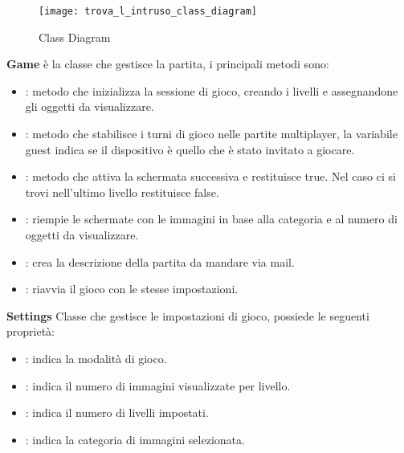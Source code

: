 \begin{figure}
	\centering
	\texttt{[image: trova\_l\_intruso\_class\_diagram]}
	\caption{Class Diagram}
	\label{fig:class_diagram}
\end{figure}
\begin{description}
\item \textbf{Game} \`{e} la classe che gestisce la partita, i principali metodi sono:
\begin{itemize}
\item {}: metodo che inizializza la sessione di gioco, creando i livelli e assegnandone gli oggetti da visualizzare.
\item {}: metodo che stabilisce i turni di gioco nelle partite multiplayer, la variabile guest indica se il dispositivo \`{e} quello che \`{e} stato invitato a giocare.
\item {}: metodo che attiva la schermata successiva e restituisce true. Nel caso ci si trovi nell'ultimo livello restituisce false.
\item {}: riempie le schermate con le immagini in base alla categoria e al numero di oggetti da visualizzare.
\item {}: crea la descrizione della partita da mandare via mail.
\item {}: riavvia il gioco con le stesse impostazioni.
\end{itemize}
\item \textbf{Settings} Classe che gestisce le impostazioni di gioco, possiede le seguenti propriet\`{a}:
\begin{itemize}
\item {}: indica la modalit\`{a} di gioco.
\item {}: indica il numero di immagini visualizzate per livello.
\item {}: indica il numero di livelli impostati.
\item {}: indica la categoria di immagini selezionata.
\end{itemize}


\end{description}
